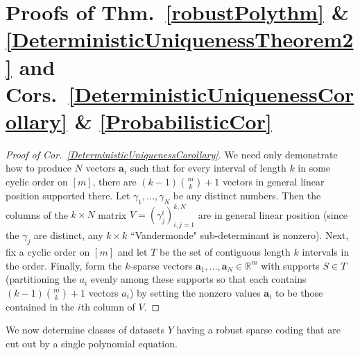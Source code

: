 \documentclass[journal, twocolumn]{IEEEtran}
\newtheorem{remark}{Remark}
\begin{document}

\section{Proofs of Thm.~\ref{robustPolythm} \& \ref{DeterministicUniquenessTheorem2} and Cors.~\ref{DeterministicUniquenessCorollary} \& \ref{ProbabilisticCor}}

\begin{proof}[Proof of Cor.~\ref{DeterministicUniquenessCorollary}]
We need only demonstrate how to produce $N$ vectors $\mathbf{a}_i$ such that for every interval of length $k$ in some cyclic order on $[m]$, there are  \mbox{$(k-1){m \choose k}+1$} vectors in general linear position supported there. Let $\gamma_1, \ldots, \gamma_N$ be any distinct numbers. Then the columns of the $k \times N$ matrix $V = (\gamma^i_j)^{k,N}_{i,j=1}$ are in general linear position (since the $\gamma_j$ are distinct, any $k \times k$ ``Vandermonde" sub-determinant is nonzero). Next, fix a cyclic order on $[m]$ and let $T$ be the set of contiguous length $k$ intervals in the order. Finally, form the $k$-sparse vectors $\mathbf{a}_1, \ldots, \mathbf{a}_N \in \mathbb{R}^m$ with supports $S \in T$ (partitioning the $a_i$ evenly among these supports so that each contains $(k-1){m \choose k}+1$ vectors $a_i$) by setting the nonzero values $\mathbf{a}_i$ to be those contained in the $i$th column of $V$.
\end{proof}

We now determine classes of datasets $Y$ having a robust sparse coding that are cut out by a single polynomial equation.
\end{document}
